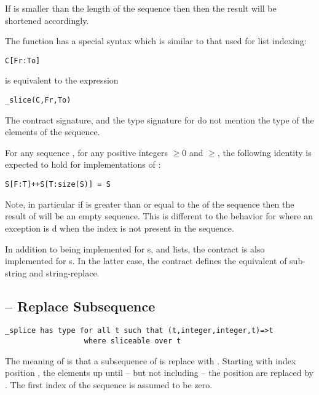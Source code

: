 If  is smaller than the length of the sequence then then the result will be shortened accordingly.

The  function has a special syntax which is similar to that used for list indexing:
\begin{lstlisting}
C[Fr:To]
\end{lstlisting}
is equivalent to the expression
\begin{lstlisting}
_slice(C,Fr,To)
\end{lstlisting}

\begin{aside}
The contract signature, and the type signature for  do not mention the type of the elements of the sequence.
\end{aside}

\begin{aside}
For any sequence , for any positive integers  $\ge0$ and $\ge$, the following identity is expected to hold for implementations of :
\begin{lstlisting}
S[F:T]++S[T:size(S)] = S
\end{lstlisting}
Note, in particular if  is greater than or equal to the  of the sequence then the result of  will be an empty sequence. This is different to the behavior for  where an exception is d when the index is not present in the sequence.
\end{aside}

\begin{aside}
In addition to being implemented for s, and  lists, the  contract is also implemented for s. In the latter case, the  contract defines the equivalent of sub-string and string-replace.
\end{aside}

\subsection{ -- Replace Subsequence}
\label{spliceFunction}
\begin{lstlisting}
_splice has type for all t such that (t,integer,integer,t)=>t
                  where sliceable over t
\end{lstlisting}
The meaning of  is that a subsequence of  is replace with . Starting with index position , the elements up until -- but not including -- the position  are replaced by . The first index of the sequence is assumed to be zero.

